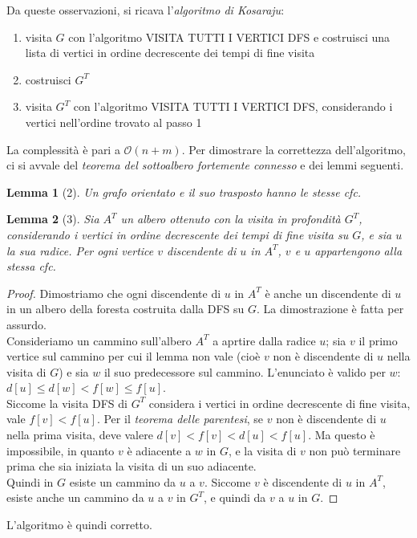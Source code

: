 \documentclass[11pt]{book}
\newtheorem*{lemma}{Lemma}
\begin{document}
Da queste osservazioni, si ricava l'\textit{algoritmo di Kosaraju}: 
\begin{enumerate}
    \item visita $G$ con l'algoritmo VISITA TUTTI I VERTICI DFS e costruisci una lista di vertici in ordine decrescente 
    dei tempi di fine visita 
    \item costruisci $G^T$
    \item visita $G^T$ con l'algoritmo VISITA TUTTI I VERTICI DFS, considerando i vertici nell'ordine trovato al passo 1 
\end{enumerate}
La complessità è pari a $\mathcal{O}(n+m)$.
Per dimostrare la correttezza dell'algoritmo, ci si avvale del \textit{teorema del sottoalbero fortemente connesso} e dei 
lemmi seguenti.
\begin{lemma}[2]
    Un grafo orientato e il suo trasposto hanno le stesse cfc.
\end{lemma}
\begin{lemma}[3]
    Sia $A^T$ un albero ottenuto con la visita in profondità $G^T$, considerando i vertici in ordine decrescente dei tempi 
    di fine visita su $G$, e sia $u$ la sua radice. Per ogni vertice $v$ discendente di $u$ in $A^T$, $v$ e $u$ appartengono 
    alla stessa cfc.
\end{lemma}
\begin{proof}
    Dimostriamo che ogni discendente di $u$ in $A^T$ è anche un discendente di $u$ in un albero della foresta costruita 
    dalla DFS su $G$. La dimostrazione è fatta per assurdo.\\
    Consideriamo un cammino sull'albero $A^T$ a aprtire dalla radice $u$; sia $v$ il primo vertice sul cammino per cui il 
    lemma non vale (cioè $v$ non è discendente di $u$ nella visita di $G$) e sia $w$ il suo predecessore sul cammino. 
    L'enunciato è valido per $w$: $d[u]\leq d[w]<f[w]\leq f[u]$.\\
    Siccome la visita DFS di $G^T$ considera i vertici in ordine decrescente di fine visita, vale $f[v]<f[u]$.
    Per il \textit{teorema delle parentesi}, se $v$ non è discendente di $u$ nella prima visita, deve valere $d[v]<f[v]<d[u]<f[u]$.
    Ma questo è impossibile, in quanto $v$ è adiacente a $w$ in $G$, e la visita di $v$ non può terminare prima che sia 
    iniziata la visita di un suo adiacente.\\
    Quindi in $G$ esiste un cammino da $u$ a $v$. Siccome $v$ è discendente di $u$ in $A^T$, esiste anche un cammino da 
    $u$ a $v$ in $G^T$, e quindi da $v$ a $u$ in $G$.
\end{proof}
L'algoritmo è quindi corretto.
\end{document}
